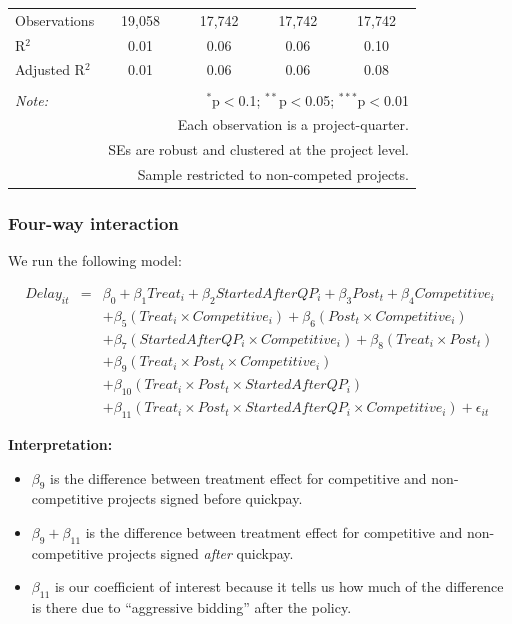 \documentclass[
]{article}
\providecommand{\tightlist}{%
  \setlength{\itemsep}{0pt}\setlength{\parskip}{0pt}}
\begin{document}
\begin{table}[H]
\begin{tabular}{@{\extracolsep{-2pt}}lcccc}
Observations & 19,058 & 17,742 & 17,742 & 17,742 \\ 
R$^{2}$ & 0.01 & 0.06 & 0.06 & 0.10 \\ 
Adjusted R$^{2}$ & 0.01 & 0.06 & 0.06 & 0.08 \\ 
\hline 
\hline \\[-1.8ex] 
\textit{Note:}  & \multicolumn{4}{r}{$^{*}$p$<$0.1; $^{**}$p$<$0.05; $^{***}$p$<$0.01} \\ 
 & \multicolumn{4}{r}{Each observation is a project-quarter.} \\ 
 & \multicolumn{4}{r}{SEs are robust and clustered at the project level.} \\ 
 & \multicolumn{4}{r}{Sample restricted to non-competed projects.} \\ 
\end{tabular} 
\end{table}

\hypertarget{four-way-interaction}{%
\subsubsection{Four-way interaction}\label{four-way-interaction}}

We run the following model:

\[\begin{aligned} Delay_{it} &=& \beta_0 +\beta_1 Treat_i+ \beta_2 StartedAfterQP_i+ \beta_3 Post_t+ \beta_4 Competitive_i\\ && +  \beta_5 (Treat_i \times Competitive_i) + \beta_6 (Post_t \times Competitive_i)\\ && +  \beta_7 (StartedAfterQP_i \times Competitive_i) +\beta_8 (Treat_i \times Post_t)\\ && + \beta_9 (Treat_i \times Post_t \times Competitive_i) \\ && + \beta_{10} (Treat_i \times Post_t \times StartedAfterQP_i )\\ && + \beta_{11} (Treat_i \times Post_t \times StartedAfterQP_i \times Competitive_i) + \epsilon_{it} \end{aligned}\]

\textbf{Interpretation:}

\begin{itemize}
\tightlist
\item
  \(\beta_9\) is the difference between treatment effect for competitive
  and non-competitive projects signed before quickpay.
\item
  \(\beta_9 + \beta_{11}\) is the difference between treatment effect
  for competitive and non-competitive projects signed \emph{after}
  quickpay.
\item
  \(\beta_{11}\) is our coefficient of interest because it tells us how
  much of the difference is there due to ``aggressive bidding'' after
  the policy.
\end{itemize}
\end{document}
